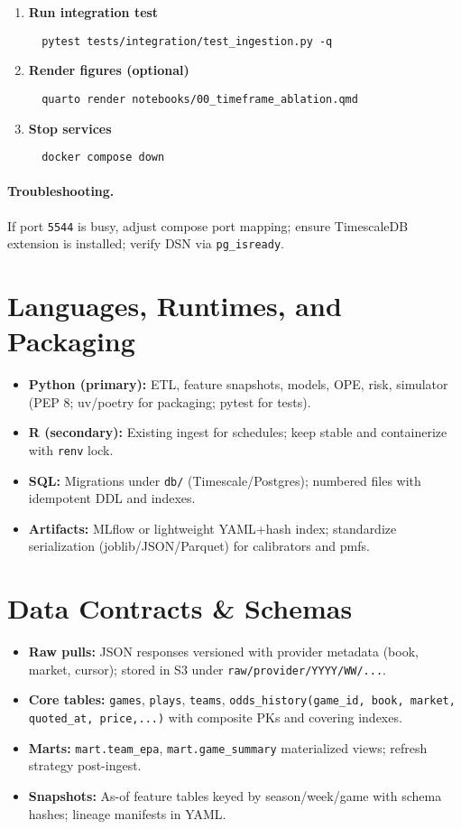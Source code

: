 \begin{enumerate}
  \item \textbf{Run integration test}
  \begin{verbatim}
  pytest tests/integration/test_ingestion.py -q
  \end{verbatim}

  \item \textbf{Render figures (optional)}
  \begin{verbatim}
  quarto render notebooks/00_timeframe_ablation.qmd
  \end{verbatim}

  \item \textbf{Stop services}
  \begin{verbatim}
  docker compose down
  \end{verbatim}
\end{enumerate}
\paragraph{Troubleshooting.} If port \texttt{5544} is busy, adjust compose port mapping; ensure TimescaleDB extension is installed; verify DSN via \texttt{pg\_isready}.

\section{Languages, Runtimes, and Packaging}
\begin{itemize}
  \item \textbf{Python (primary):} ETL, feature snapshots, models, OPE, risk, simulator (PEP 8; uv/poetry for packaging; pytest for tests).
  \item \textbf{R (secondary):} Existing ingest for schedules; keep stable and containerize with \texttt{renv} lock.
  \item \textbf{SQL:} Migrations under \texttt{db/} (Timescale/Postgres); numbered files with idempotent DDL and indexes.
  \item \textbf{Artifacts:} MLflow or lightweight YAML+hash index; standardize serialization (joblib/JSON/Parquet) for calibrators and pmfs.
\end{itemize}

\section{Data Contracts \& Schemas}
\begin{itemize}
  \item \textbf{Raw pulls:} JSON responses versioned with provider metadata (book, market, cursor); stored in S3 under \texttt{raw/provider/YYYY/WW/...}.
  \item \textbf{Core tables:} \texttt{games}, \texttt{plays}, \texttt{teams}, \texttt{odds\_history(game\_id, book, market, quoted\_at, price,...)} with composite PKs and covering indexes.
  \item \textbf{Marts:} \texttt{mart.team\_epa}, \texttt{mart.game\_summary} materialized views; refresh strategy post-ingest.
  \item \textbf{Snapshots:} As-of feature tables keyed by season/week/game with schema hashes; lineage manifests in YAML.
\end{itemize}

